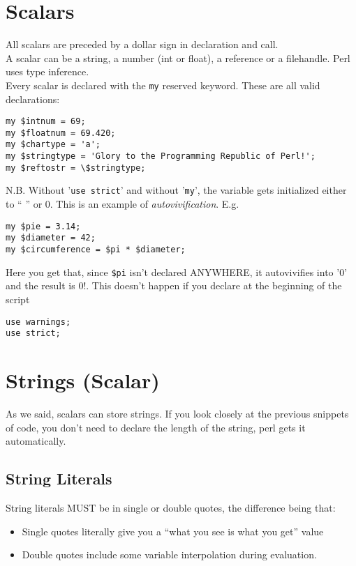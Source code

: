 \documentclass{article}
\begin{document}
\section{Scalars}
All scalars are preceded by a dollar sign in declaration and call.\\
A scalar can be a string, a number (int or float), a reference or a filehandle. Perl uses type inference.\\
Every scalar is declared with the \texttt{my} reserved keyword. These are all valid declarations:
\begin{verbatim}
my $intnum = 69;
my $floatnum = 69.420;
my $chartype = 'a';
my $stringtype = 'Glory to the Programming Republic of Perl!';
my $reftostr = \$stringtype;
\end{verbatim}
N.B. Without '\texttt{use strict}' and without '\texttt{my}', the variable gets initialized either to `` '' or 0. This is an example of \textit{autovivification}. E.g.
\begin{verbatim}
my $pie = 3.14;
my $diameter = 42;
my $circumference = $pi * $diameter;
\end{verbatim}
Here you get that, since \texttt{\$pi} isn't declared ANYWHERE, it autovivifies into '0' and the result is 0!. This doesn't happen if you declare at the beginning of the script 
\begin{verbatim}
use warnings;
use strict;
\end{verbatim}
\section{Strings (Scalar)}
As we said, scalars can store strings. If you look closely at the previous snippets of code, you don't need to declare the length of the string, perl gets it automatically.
\subsection{String Literals}
String literals MUST be in single or double quotes, the difference being that:
\begin{itemize}
\item Single quotes literally give you a ``what you see is what you get'' value
\item Double quotes include some variable interpolation during evaluation.
\end{itemize}
\end{document}
